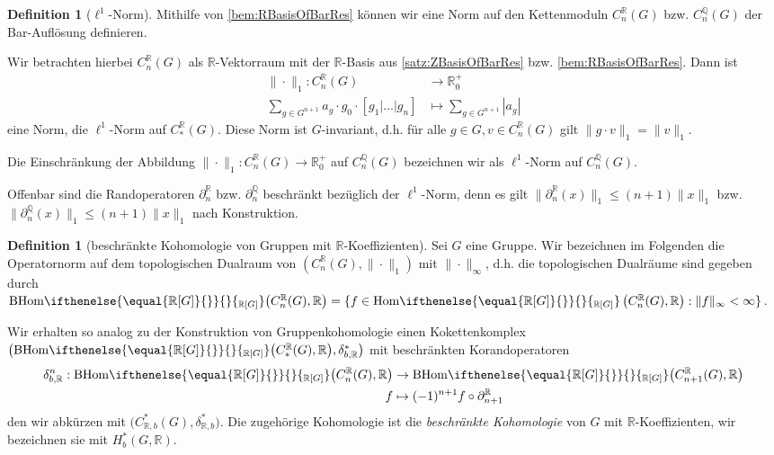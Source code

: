 \documentclass[a4paper,twoside,10pt]{scrreprt}
\newcommand{\Q}{\mathbb{Q}}
\newcommand{\R}{\mathbb{R}}
\newcommand{\Hom}[2][]{\text{Hom}%
\ifthenelse{\equal{#1}{}}{}{_{#1}}%
\left(#2\right)}%
\newcommand{\BHom}[2][]{\text{BHom}%
\ifthenelse{\equal{#1}{}}{}{_{#1}}%
\bigl(#2\bigr)}%
\theoremstyle{definition}
\newtheorem{definition}[satz]{Definition}
\begin{document}
\begin{definition}[$\ell^1$-Norm]
Mithilfe von \cref{bem:RBasisOfBarRes} können wir eine Norm auf den Kettenmoduln $C_n^{\R}(G)$ bzw. $C_n^{\Q}(G)$ der Bar-Auflösung definieren.\par
Wir betrachten hierbei $C_n^{\R}(G)$ als $\R$-Vektorraum mit der $\R$-Basis aus \cref{satz:ZBasisOfBarRes} bzw. \cref{bem:RBasisOfBarRes}. Dann ist
\begin{align*}
\|\cdot\|_1:C_n^{\R}(G)&\to\R_0^+\\
\sum\limits_{g\in {G^{n+1}}} a_g\cdot g_0\cdot [g_1|\ldots|g_n]&\mapsto\sum\limits_{g\in {G^{n+1}}} |a_g|
\end{align*}
eine Norm, die $\ell^1$-Norm auf $C_*^{\R}(G)$. Diese Norm ist $G$-invariant, d.h. für alle $g\in G, v\in C_n^{\R}(G)$ gilt $\|g\cdot v\|_1=\|v\|_1$.\par
Die Einschränkung der Abbildung $\|\cdot\|_1:C_n^{\R}(G)\to\R_0^+$ auf $C_n^{\Q}(G)$ bezeichnen wir als $\ell^1$-Norm auf $C_n^{\Q}(G)$.\par
Offenbar sind die Randoperatoren $\partial_n^{\R}$ bzw. $\partial_n^{\Q}$ beschränkt bezüglich der $\ell^1$-Norm, denn es gilt $\|\partial_n^{\R}(x)\|_1\leq (n+1)\|x\|_1$ bzw.  $\|\partial_n^{\Q}(x)\|_1\leq (n+1)\|x\|_1$ nach Konstruktion.
\end{definition}

\begin{definition}[beschränkte Kohomologie von Gruppen mit $\R$-Koeffizienten]
Sei $G$ eine Gruppe. Wir bezeichnen im Folgenden die Operatornorm auf dem topologischen Dualraum von $\left(C_n^{\R}(G),\|\cdot\|_1\right)$ mit $\|\cdot\|_{\infty}$, d.h. die topologischen Dualräume sind gegeben durch $\BHom[\R{[}G{]}]{C_n^{\R}(G),\R}=\{f\in\Hom[\R{[}G{]}]{C_n^{\R}(G),\R}:\|f\|_{\infty}< \infty\}$.\par
Wir erhalten so analog zu der Konstruktion von Gruppenkohomologie einen Kokettenkomplex $\bigl(\BHom[\R{[}G{]}]{C_*^{\R}(G),\R},\delta_{b,\R}^*\bigr)$ mit beschränkten Korandoperatoren
\begin{align*}
\delta_{b,\R}^n:\BHom[\R{[}G{]}]{C_n^{\R}(G),\R}&\to \BHom[\R{[}G{]}]{C_{n+1}^{\R}(G),\R}\\
f&\mapsto (-1)^{n+1}f\circ \partial_{n+1}^{\R}
\end{align*}
den wir abkürzen mit $\bigl(C_{\R,b}^*(G),\delta_{\R,b}^*\bigr)$. Die zugehörige Kohomologie ist die \emph{beschränkte Kohomologie} von $G$ mit $\R$-Koeffizienten, wir bezeichnen sie mit $H_b^*(G,\R)$.
\end{definition}
\end{document}
